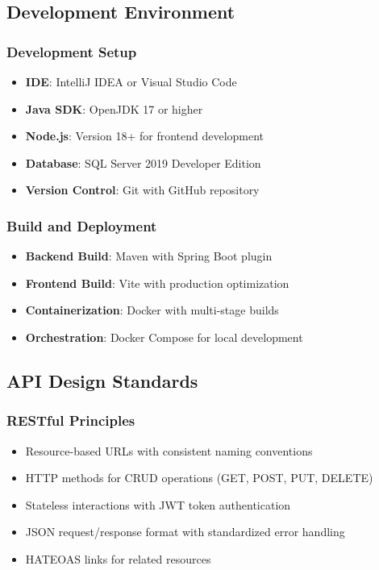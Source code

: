 \documentclass[12pt,a4paper]{article}
\begin{document}
\subsection{Development Environment}

\subsubsection{Development Setup}
\begin{itemize}
    \item \textbf{IDE}: IntelliJ IDEA or Visual Studio Code
    \item \textbf{Java SDK}: OpenJDK 17 or higher
    \item \textbf{Node.js}: Version 18+ for frontend development
    \item \textbf{Database}: SQL Server 2019 Developer Edition
    \item \textbf{Version Control}: Git with GitHub repository
\end{itemize}

\subsubsection{Build and Deployment}
\begin{itemize}
    \item \textbf{Backend Build}: Maven with Spring Boot plugin
    \item \textbf{Frontend Build}: Vite with production optimization
    \item \textbf{Containerization}: Docker with multi-stage builds
    \item \textbf{Orchestration}: Docker Compose for local development
\end{itemize}

\subsection{API Design Standards}

\subsubsection{RESTful Principles}
\begin{itemize}
    \item Resource-based URLs with consistent naming conventions
    \item HTTP methods for CRUD operations (GET, POST, PUT, DELETE)
    \item Stateless interactions with JWT token authentication
    \item JSON request/response format with standardized error handling
    \item HATEOAS links for related resources
\end{itemize}
\end{document}
